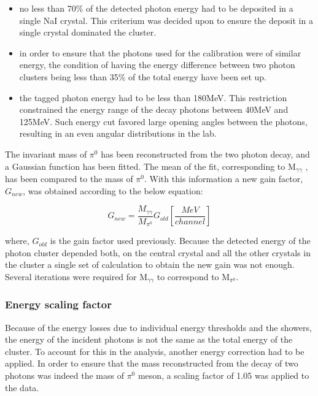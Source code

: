 \begin{itemize}
\item no less than 70\% of the detected photon energy had to be deposited in a single NaI crystal. This criterium was decided upon to ensure the deposit in a single crystal dominated the cluster.
\item in order to ensure that the photons used for the calibration were of similar energy, the condition of having the energy difference between two photon clusters being less than 35\% of the total energy have been set up.
\item the tagged photon energy had to be less than 180MeV. This restriction constrained the energy range of the decay photons between 40MeV and 125MeV. Such energy cut favored large opening angles between the photons, resulting in an even angular distributions in the lab.
\end{itemize}

\indent The invariant mass of $\pi^{0}$ has been reconstructed from the two photon decay, and a Gaussian function has been fitted. The mean of the fit, corresponding to M$_{\gamma\gamma}$ , has been compared to the mass of $\pi^{0}$. With this information a new gain factor, $G_{new}$, was obtained according to the below equation:

\begin{equation}
G_{new}=\frac{M_{\gamma\gamma}}{M_{\pi^{0}}}G_{old} [\frac{MeV}{channel}]
\end{equation}

where, $G_{old}$ is the gain factor used previously. Because the detected energy of the photon cluster depended both, on the central crystal and all the other crystals in the cluster a single set of calculation to obtain the new gain was not enough. Several iterations were required for M$_{\gamma\gamma}$ to correspond to M$_{\pi^{0}}$.

\subsubsection{Energy scaling factor}

\indent Because of the energy losses due to individual energy thresholds and the showers, the energy of the incident photons is not the same as the total energy of the cluster. To account for this in the analysis, another energy correction had to be applied. In order to ensure that the mass reconstructed from the decay of two photons was indeed the mass of $\pi^{0}$ meson, a scaling factor of 1.05 was applied to the data.

